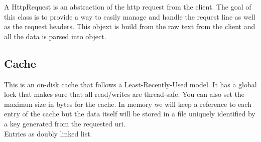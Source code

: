 \documentclass{report}
\begin{document}
A HttpRequest is an abstraction of the http request from the client. The goal of this class is to provide a way to easily manage and handle the request line as well as the request headers. This objext is build from the raw text from the client and all the data is parsed into object. 

\subsection*{Cache}
This is an on-disk cache that follows a Least-Recently-Used model. It has a global lock that makes sure that all read/writes are thread-safe. You can also set the maximun size in bytes for the cache. In memory we will keep a reference to each entry of the cache but the data itself will be stored in a file uniquely identified by a key generated from the requested uri.\\

Entries as doubly linked list.
\end{document}

